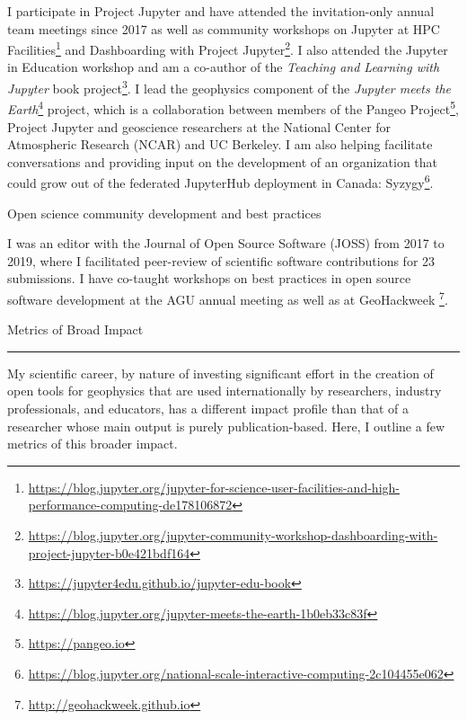 \documentclass[a4paper, 11pt]{article}
\newcommand{\heading}[1]{
    \begin{minipage}[t]{\textwidth}
    \vspace{0.05cm}
    {\LARGE #1}\\
    \vspace{-0.24cm}
    \hrule
    \end{minipage}
    \vspace{0.05cm}

}
\newcommand{\subheading}[1]{
    \vspace{0.4cm}
    {\Large #1}\\
    \vspace{-0.2cm}
}
\begin{document}
I participate in Project Jupyter and have attended the invitation-only annual team meetings since 2017 as well as community workshops on Jupyter at HPC Facilities\footnote{\href{https://blog.jupyter.org/jupyter-for-science-user-facilities-and-high-performance-computing-de178106872}{https://blog.jupyter.org/jupyter-for-science-user-facilities-and-high-performance-computing-de178106872}}
and Dashboarding with Project Jupyter\footnote{\href{https://blog.jupyter.org/jupyter-community-workshop-dashboarding-with-project-jupyter-b0e421bdf164}{https://blog.jupyter.org/jupyter-community-workshop-dashboarding-with-project-jupyter-b0e421bdf164}}.
I also attended the Jupyter in Education workshop and am a co-author of the \emph{Teaching and Learning with Jupyter} book project\footnote{\href{https://jupyter4edu.github.io/jupyter-edu-book}{https://jupyter4edu.github.io/jupyter-edu-book}}. I lead the geophysics component of the \emph{Jupyter meets the Earth}\footnote{\href{https://blog.jupyter.org/jupyter-meets-the-earth-1b0eb33c83f}{https://blog.jupyter.org/jupyter-meets-the-earth-1b0eb33c83f}} project, which is a collaboration between members of the Pangeo Project\footnote{\href{https://pangeo.io}{https://pangeo.io}}, Project Jupyter and geoscience researchers at the National Center for Atmospheric Research (NCAR) and UC Berkeley. I am also helping facilitate conversations and providing input on the development of an organization that could grow out of the federated JupyterHub deployment in Canada: Syzygy\footnote{\href{https://blog.jupyter.org/national-scale-interactive-computing-2c104455e062}{https://blog.jupyter.org/national-scale-interactive-computing-2c104455e062}}.

\subheading{Open science community development and best practices}

I was an editor with the Journal of Open Source Software (JOSS) from 2017 to 2019, where I facilitated peer-review of scientific software contributions for 23 submissions. I have co-taught workshops on best practices in open source software development at the AGU annual meeting as well as at GeoHackweek
\footnote{\href{http://geohackweek.github.io}{http://geohackweek.github.io}}.


\clearpage

\heading{Metrics of Broad Impact}

My scientific career, by nature of investing significant effort in the creation of open tools for geophysics that are used internationally by researchers, industry professionals, and educators, has a different impact profile than that of a researcher whose main output is purely publication-based. Here, I outline a few metrics of this broader impact. \vspace{0.3cm}
\end{document}
